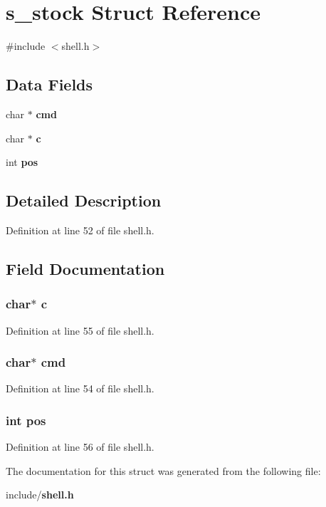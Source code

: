 \section{s\-\_\-stock Struct Reference}
\label{structs__stock}


{\ttfamily \#include $<$shell.\-h$>$}

\subsection*{Data Fields}
\begin{DoxyCompactItemize}
\item 
char $\ast$ {\bf cmd}
\item 
char $\ast$ {\bf c}
\item 
int {\bf pos}
\end{DoxyCompactItemize}


\subsection{Detailed Description}


Definition at line 52 of file shell.\-h.



\subsection{Field Documentation}
\subsubsection[{c}]{\setlength{\rightskip}{0pt plus 5cm}char$\ast$ c}\label{structs__stock_a9df78bd38aa81763ad1c56f3de8d5d3e}


Definition at line 55 of file shell.\-h.

\subsubsection[{cmd}]{\setlength{\rightskip}{0pt plus 5cm}char$\ast$ cmd}\label{structs__stock_a7353cae57e2530c316ddacb27ef14932}


Definition at line 54 of file shell.\-h.

\subsubsection[{pos}]{\setlength{\rightskip}{0pt plus 5cm}int pos}\label{structs__stock_a1910d262855b71da353ed0d07a6c7823}


Definition at line 56 of file shell.\-h.



The documentation for this struct was generated from the following file\-:\begin{DoxyCompactItemize}
\item 
include/{\bf shell.\-h}\end{DoxyCompactItemize}

